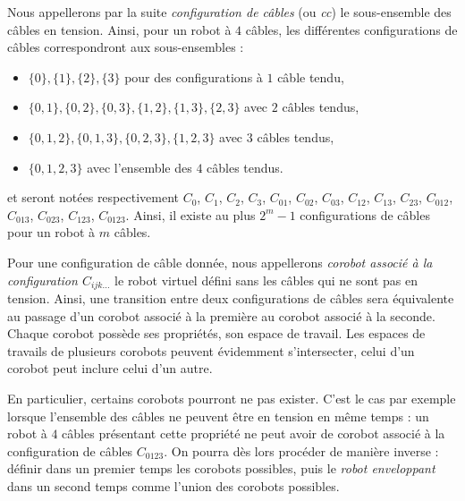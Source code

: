 Nous appellerons par la suite {\it configuration de câbles} (ou {\it cc}) le sous-ensemble des câbles en tension. Ainsi, pour un robot à $4$ câbles, les différentes configurations de câbles correspondront aux sous-ensembles :
\begin{itemize}
 \item $\{0\},\{1\},\{2\},\{3\}$ pour des configurations à $1$ câble tendu,
 \item $\{0,1\},\{0,2\},\{0,3\},\{1,2\},\{1,3\},\{2,3\}$ avec $2$ câbles tendus,
 \item $\{0,1,2\},\{0,1,3\},\{0,2,3\},\{1,2,3\}$ avec $3$ câbles tendus,
 \item $\{0,1,2,3\}$ avec l'ensemble des $4$ câbles tendus.
\end{itemize}
et seront notées respectivement $C_{0}$, $C_{1}$, $C_{2}$, $C_{3}$, $C_{01}$, $C_{02}$, $C_{03}$, $C_{12}$, $C_{13}$, $C_{23}$, $C_{012}$, $C_{013}$, $C_{023}$, $C_{123}$, $C_{0123}$. Ainsi, il existe au plus $2^m-1$ configurations de câbles pour un robot à $m$ câbles.

Pour une configuration de câble donnée, nous appellerons {\it corobot associé à la configuration $C_{ijk\dots}$} le robot virtuel défini sans les câbles qui ne sont pas en tension. Ainsi, une transition entre deux configurations de câbles sera équivalente au passage d'un corobot associé à la première au corobot associé à la seconde. Chaque corobot possède ses propriétés, son espace de travail. Les espaces de travails de plusieurs corobots peuvent évidemment s'intersecter, celui d'un corobot peut inclure celui d'un autre.

En particulier, certains corobots pourront ne pas exister. C'est le cas par exemple lorsque l'ensemble des câbles ne peuvent être en tension en même temps : un robot à $4$ câbles présentant cette propriété ne peut avoir de corobot associé à la configuration de câbles $C_{0123}$. On pourra dès lors procéder de manière inverse : définir dans un premier temps les corobots possibles, puis le {\it robot enveloppant} dans un second temps comme l'union des corobots possibles.

